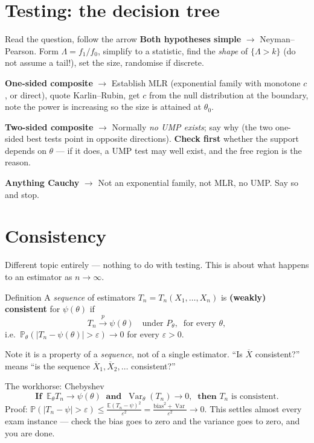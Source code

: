 \documentclass[11pt]{article}
\newcommand{\E}{\mathbb{E}}
\newcommand{\Var}{\operatorname{Var}}
\newcommand{\Prob}{\mathbb{P}}
\newcommand{\Xbar}{\overline{X}}
\newcommand{\pto}{\overset{p}{\longrightarrow}}
\begin{document}
\section{Testing: the decision tree}

\begin{recipe}{Read the question, follow the arrow}
\textbf{Both hypotheses simple} $\to$ Neyman--Pearson. Form $\Lambda=f_1/f_0$, simplify to a
statistic, find the \emph{shape} of $\{\Lambda>k\}$ (do not assume a tail!), set the size,
randomise if discrete.

\smallskip
\textbf{One-sided composite} $\to$ Establish MLR (exponential family with monotone $c$, or
direct), quote Karlin--Rubin, get $c$ from the null distribution at the boundary, note the
power is increasing so the size is attained at $\theta_0$.

\smallskip
\textbf{Two-sided composite} $\to$ Normally \emph{no UMP exists}; say why (the two one-sided
best tests point in opposite directions). \textbf{Check first} whether the support depends on
$\theta$ --- if it does, a UMP test may well exist, and the free region is the reason.

\smallskip
\textbf{Anything Cauchy} $\to$ Not an exponential family, not MLR, no UMP. Say so and stop.
\end{recipe}

\section{Consistency}

Different topic entirely --- nothing to do with testing. This is about what happens to an
estimator as $n\to\infty$.

\begin{idea}{Definition}
A \emph{sequence} of estimators $T_n=T_n(X_1,\dots,X_n)$ is \textbf{(weakly) consistent} for
$\psi(\theta)$ if
\[
T_n\pto\psi(\theta)\quad\text{under }P_\theta,\ \text{ for every }\theta ,
\]
i.e.\ $\Prob_\theta(|T_n-\psi(\theta)|>\varepsilon)\to0$ for every $\varepsilon>0$.

Note it is a property of a \emph{sequence}, not of a single estimator. ``Is $\Xbar$
consistent?'' means ``is the sequence $\Xbar_1,\Xbar_2,\dots$ consistent?''
\end{idea}

\begin{idea}{The workhorse: Chebyshev}
\[
\textbf{If }\ \E_\theta T_n\to\psi(\theta)\ \textbf{ and }\ \Var_\theta(T_n)\to0,
\ \textbf{ then } T_n \text{ is consistent.}
\]
Proof: $\Prob(|T_n-\psi|>\varepsilon)\le\frac{\E(T_n-\psi)^2}{\varepsilon^2}
=\frac{\text{bias}^2+\Var}{\varepsilon^2}\to0$. This settles almost every exam instance ---
check the bias goes to zero and the variance goes to zero, and you are done.
\end{idea}
\end{document}
